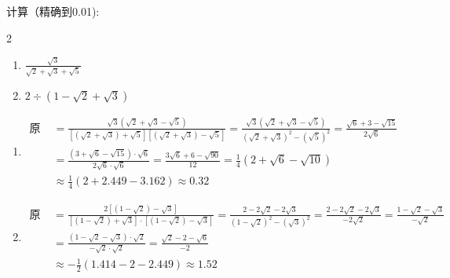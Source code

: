 \begin{example}
    计算（精确到0.01):
\begin{multicols}{2}
    \begin{enumerate}
        \item \quad $\frac{\sqrt{3}}{\sqrt{2}+\sqrt{3}+\sqrt{5}}$
        \item \quad $2\div \left(1-\sqrt{2}+\sqrt{3}\right)$
    \end{enumerate}
\end{multicols}
\end{example}

\begin{solution}
    \begin{enumerate}
    \item \[\begin{split}
\text{原式 }&=\frac{\sqrt{3}(\sqrt{2}+\sqrt{3}-\sqrt{5})}{\left[(\sqrt{2}+\sqrt{3})+\sqrt{5}\right]\left[(\sqrt{2}+\sqrt{3})-\sqrt{5}\right]} 
= \frac{\sqrt{3}(\sqrt{2}+\sqrt{3}-\sqrt{5})}{(\sqrt{2}+\sqrt{3})^2-(\sqrt{5})^2} 
= \frac{\sqrt{6}+3-\sqrt{15}}{2\sqrt{6}}\\
&= \frac{(3+\sqrt{6}-\sqrt{15})\cdot \sqrt{6}}{2\sqrt{6}\cdot \sqrt{6}}
=\frac{3\sqrt{6}+6-\sqrt{90}}{12}=\frac{1}{4}\left(2+\sqrt{6}-\sqrt{10}\right)\\
&\approx \frac{1}{4}(2+2.449-3.162)\approx 0.32
    \end{split}\]
            \item \[\begin{split}
\text{原式 }&= \frac{2\left[(1-\sqrt{2})-\sqrt{3}\right]}{\left[(1-\sqrt{2})+\sqrt{3}\right]\cdot \left[(1-\sqrt{2})-\sqrt{3}\right]}
= \frac{2-2\sqrt{2}-2\sqrt{3}}{(1-\sqrt{2})^2-(\sqrt{3})^2} 
=  \frac{2-2\sqrt{2}-2\sqrt{3}}{-2\sqrt{2}} 
= \frac{1-\sqrt{2}-\sqrt{3}}{-\sqrt{2}} \\
&=\frac{(1-\sqrt{2}-\sqrt{3})\cdot \sqrt{2}}{-\sqrt{2}\cdot \sqrt{2}}
=\frac{\sqrt{2}-2-\sqrt{6}}{-2}\\
&\approx -\frac{1}{2}(1.414-2-2.449)\approx 1.52
    \end{split}\]
    \end{enumerate}
\end{solution}



